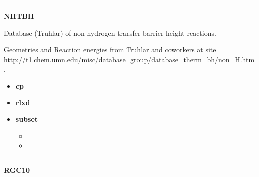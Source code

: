 \documentclass[letterpaper,10pt,english]{sphinxmanual}
\begin{document}
\bigskip\hrule{}\bigskip

\label{db:module-NHTBH}
\textbf{NHTBH}

\begin{DUlineblock}{0em}
\item[] Database (Truhlar) of non-hydrogen-transfer barrier height reactions.
\item[] Geometries and Reaction energies from Truhlar and coworkers at site \href{http://t1.chem.umn.edu/misc/database\_group/database\_therm\_bh/non\_H.htm}{http://t1.chem.umn.edu/misc/database\_group/database\_therm\_bh/non\_H.htm}.
\end{DUlineblock}
\begin{itemize}
\item {} 
\textbf{cp}  

\item {} 
\textbf{rlxd} 

\item {} 
\textbf{subset}
\begin{itemize}
\item {} 

\item {} 

\end{itemize}

\end{itemize}


\bigskip\hrule{}\bigskip

\label{db:module-RGC10}
\textbf{RGC10}
\end{document}
